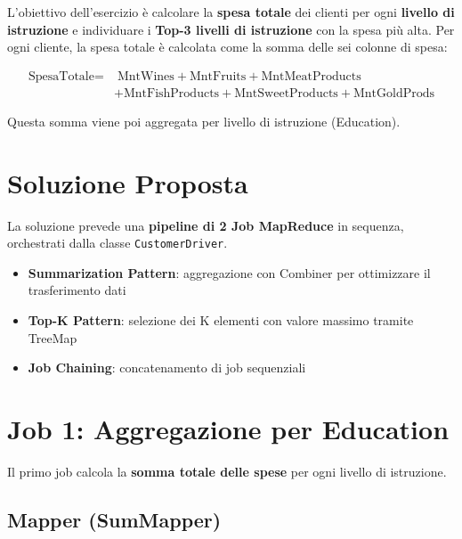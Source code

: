 \documentclass[a4paper, 12pt, oneside]{report}
\begin{document}
L'obiettivo dell'esercizio \`e calcolare la \textbf{spesa totale} dei clienti per ogni \textbf{livello di istruzione} e individuare i \textbf{Top-3 livelli di istruzione} con la spesa pi\`u alta. Per ogni cliente, la spesa totale \`e calcolata come la somma delle sei colonne di spesa:

\begin{equation}
\begin{split}
    \text{SpesaTotale} = & \; \text{MntWines} + \text{MntFruits} + \text{MntMeatProducts} \\
                         & + \text{MntFishProducts} + \text{MntSweetProducts} + \text{MntGoldProds}
\end{split}
\end{equation}

Questa somma viene poi aggregata per livello di istruzione (Education).

\section{Soluzione Proposta}

La soluzione prevede una \textbf{pipeline di 2 Job MapReduce} in sequenza, orchestrati dalla classe \texttt{CustomerDriver}.

\begin{tcolorbox}[colback=blue!5,colframe=blue!40!black,title=Pattern Utilizzati]
\begin{itemize}
    \item \textbf{Summarization Pattern}: aggregazione con Combiner per ottimizzare il trasferimento dati
    \item \textbf{Top-K Pattern}: selezione dei K elementi con valore massimo tramite TreeMap
    \item \textbf{Job Chaining}: concatenamento di job sequenziali
\end{itemize}
\end{tcolorbox}

\section{Job 1: Aggregazione per Education}

Il primo job calcola la \textbf{somma totale delle spese} per ogni livello di istruzione.

\subsection{Mapper (SumMapper)}
\end{document}
